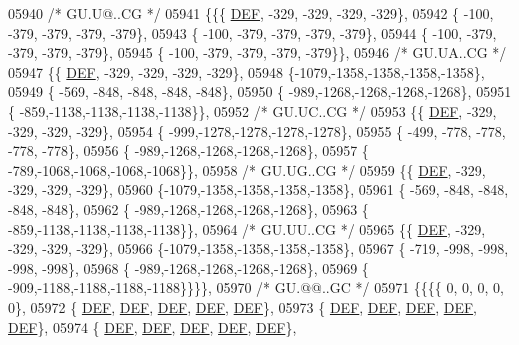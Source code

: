 \begin{DoxyCode}
05940 \textcolor{comment}{/* GU.U@..CG */}
05941 \{\{\{  \mbox{\hyperlink{1_88_84__epars_8h_a397419fc12b37ed479c8abb9d444d843}{DEF}}, -329, -329, -329, -329\},
05942 \{ -100, -379, -379, -379, -379\},
05943 \{ -100, -379, -379, -379, -379\},
05944 \{ -100, -379, -379, -379, -379\},
05945 \{ -100, -379, -379, -379, -379\}\},
05946 \textcolor{comment}{/* GU.UA..CG */}
05947 \{\{  \mbox{\hyperlink{1_88_84__epars_8h_a397419fc12b37ed479c8abb9d444d843}{DEF}}, -329, -329, -329, -329\},
05948 \{-1079,-1358,-1358,-1358,-1358\},
05949 \{ -569, -848, -848, -848, -848\},
05950 \{ -989,-1268,-1268,-1268,-1268\},
05951 \{ -859,-1138,-1138,-1138,-1138\}\},
05952 \textcolor{comment}{/* GU.UC..CG */}
05953 \{\{  \mbox{\hyperlink{1_88_84__epars_8h_a397419fc12b37ed479c8abb9d444d843}{DEF}}, -329, -329, -329, -329\},
05954 \{ -999,-1278,-1278,-1278,-1278\},
05955 \{ -499, -778, -778, -778, -778\},
05956 \{ -989,-1268,-1268,-1268,-1268\},
05957 \{ -789,-1068,-1068,-1068,-1068\}\},
05958 \textcolor{comment}{/* GU.UG..CG */}
05959 \{\{  \mbox{\hyperlink{1_88_84__epars_8h_a397419fc12b37ed479c8abb9d444d843}{DEF}}, -329, -329, -329, -329\},
05960 \{-1079,-1358,-1358,-1358,-1358\},
05961 \{ -569, -848, -848, -848, -848\},
05962 \{ -989,-1268,-1268,-1268,-1268\},
05963 \{ -859,-1138,-1138,-1138,-1138\}\},
05964 \textcolor{comment}{/* GU.UU..CG */}
05965 \{\{  \mbox{\hyperlink{1_88_84__epars_8h_a397419fc12b37ed479c8abb9d444d843}{DEF}}, -329, -329, -329, -329\},
05966 \{-1079,-1358,-1358,-1358,-1358\},
05967 \{ -719, -998, -998, -998, -998\},
05968 \{ -989,-1268,-1268,-1268,-1268\},
05969 \{ -909,-1188,-1188,-1188,-1188\}\}\}\},
05970 \textcolor{comment}{/* GU.@@..GC */}
05971 \{\{\{\{    0,    0,    0,    0,    0\},
05972 \{  \mbox{\hyperlink{1_88_84__epars_8h_a397419fc12b37ed479c8abb9d444d843}{DEF}},  \mbox{\hyperlink{1_88_84__epars_8h_a397419fc12b37ed479c8abb9d444d843}{DEF}},  \mbox{\hyperlink{1_88_84__epars_8h_a397419fc12b37ed479c8abb9d444d843}{DEF}},  \mbox{\hyperlink{1_88_84__epars_8h_a397419fc12b37ed479c8abb9d444d843}{DEF}},  \mbox{\hyperlink{1_88_84__epars_8h_a397419fc12b37ed479c8abb9d444d843}{DEF}}\},
05973 \{  \mbox{\hyperlink{1_88_84__epars_8h_a397419fc12b37ed479c8abb9d444d843}{DEF}},  \mbox{\hyperlink{1_88_84__epars_8h_a397419fc12b37ed479c8abb9d444d843}{DEF}},  \mbox{\hyperlink{1_88_84__epars_8h_a397419fc12b37ed479c8abb9d444d843}{DEF}},  \mbox{\hyperlink{1_88_84__epars_8h_a397419fc12b37ed479c8abb9d444d843}{DEF}},  \mbox{\hyperlink{1_88_84__epars_8h_a397419fc12b37ed479c8abb9d444d843}{DEF}}\},
05974 \{  \mbox{\hyperlink{1_88_84__epars_8h_a397419fc12b37ed479c8abb9d444d843}{DEF}},  \mbox{\hyperlink{1_88_84__epars_8h_a397419fc12b37ed479c8abb9d444d843}{DEF}},  \mbox{\hyperlink{1_88_84__epars_8h_a397419fc12b37ed479c8abb9d444d843}{DEF}},  \mbox{\hyperlink{1_88_84__epars_8h_a397419fc12b37ed479c8abb9d444d843}{DEF}},  \mbox{\hyperlink{1_88_84__epars_8h_a397419fc12b37ed479c8abb9d444d843}{DEF}}\},

\end{DoxyCode}
